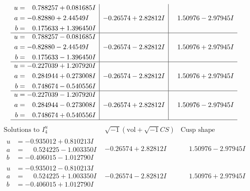 \documentclass[1p]{elsarticle_modified}
\theoremstyle{definition}
\newcommand{\I}{\sqrt{-1}}
\begin{document}
$$\begin{array}{c|c|c}
\begin{aligned}
u &= \phantom{-}0.788257 + 0.081685 I \\
a &= -0.82880 + 2.44549 I \\
b &= \phantom{-}0.175633 + 1.396450 I\end{aligned}
 & -0.26574 + 2.82812 I & \phantom{-}1.50976 - 2.97945 I \\ \hline\begin{aligned}
u &= \phantom{-}0.788257 - 0.081685 I \\
a &= -0.82880 - 2.44549 I \\
b &= \phantom{-}0.175633 - 1.396450 I\end{aligned}
 & -0.26574 - 2.82812 I & \phantom{-}1.50976 + 2.97945 I \\ \hline\begin{aligned}
u &= -0.227039 + 1.207920 I \\
a &= \phantom{-}0.284944 + 0.273008 I \\
b &= \phantom{-}0.748674 - 0.540556 I\end{aligned}
 & -0.26574 - 2.82812 I & \phantom{-}1.50976 + 2.97945 I \\ \hline\begin{aligned}
u &= -0.227039 - 1.207920 I \\
a &= \phantom{-}0.284944 - 0.273008 I \\
b &= \phantom{-}0.748674 + 0.540556 I\end{aligned}
 & -0.26574 + 2.82812 I & \phantom{-}1.50976 - 2.97945 I\\
 \hline 
 \end{array}$$\newpage$$\begin{array}{c|c|c}  
\text{Solutions to }I^u_{4}& \I (\text{vol} + \sqrt{-1}CS) & \text{Cusp shape}\\
 \hline 
\begin{aligned}
u &= -0.935012 + 0.810213 I \\
a &= \phantom{-}0.524225 - 1.003350 I \\
b &= -0.406015 - 1.012790 I\end{aligned}
 & -0.26574 + 2.82812 I & \phantom{-}1.50976 - 2.97945 I \\ \hline\begin{aligned}
u &= -0.935012 - 0.810213 I \\
a &= \phantom{-}0.524225 + 1.003350 I \\
b &= -0.406015 + 1.012790 I\end{aligned}
 & -0.26574 - 2.82812 I & \phantom{-}1.50976 + 2.97945 I \\ \hline\begin{aligned}

\end{aligned}
\end{array}$$
\end{document}

